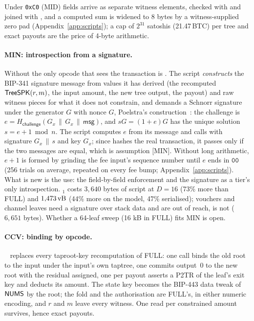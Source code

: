 Under \texttt{0xC0} (MID) fields arrive as separate witness elements,
checked with  and joined with , and a computed sum is
widened to 8 bytes by a witness-supplied zero pad
(Appendix~\ref{app:scripts}); a cap of $2^{31}$ satoshis (21.47\,BTC) per
tree and exact payouts are the price of 4-byte arithmetic.

\paragraph{MIN: introspection from a signature.}\label{sec:min}
Without  the only opcode that sees the transaction is
. The script \emph{constructs} the BIP-341 signature message
from values it has derived (the recomputed $\mathsf{TreeSPK}(r,m)$, the input
amount, the new tree output, the payout) and raw witness pieces for what
it does not constrain, and demands a Schnorr signature under the
generator $G$ with nonce $G$, Poelstra's construction~\cite{catschnorr}:
the challenge is $e = H_{\mathsf{challenge}}(G_x \,\|\, G_x \,\|\,
\mathsf{msg})$, and $s G = (1 + e) G$ has the unique solution
$s = e + 1 \bmod n$. The script computes $e$ from its message and calls
 with signature $G_x \,\|\, s$ and key $G_x$; since
 hashes the real transaction, it passes only if the two
messages are equal, which is assumption [MIN]. Without long
arithmetic, $e + 1$ is formed by grinding the fee input's sequence number
until $e$ ends in $\mathtt{00}$ (256 trials on average, repeated on every
fee bump; Appendix~\ref{app:scripts}). What is new is the use: the
field-by-field enforcement and the signature as a tier's only
introspection. $_1$ costs
$3{,}640$ bytes of script at $D = 16$ (73\% more than FULL) and
$1{,}473\,\mathrm{vB}$ (44\% more on the model, 47\% serialised); vouchers and channel leaves need a signature
over stack data and are out of reach,  is not ($6{,}651$
bytes). Whether a 64-leaf sweep (16 kB in FULL) fits MIN is open.

\paragraph{CCV: binding by opcode.}\label{sec:ccv}
~\cite{bip443} replaces every taproot-key
recomputation of FULL: one call binds the old root to the input under
the input's own taptree, one commits output~0 to the new root with the
residual assigned, one per payout asserts a P2TR of the leaf's exit key
and deducts its amount. The state key becomes the BIP-443 data tweak of
$\mathsf{NUMS}$ by the root; the fold and the authorisation are FULL's, in either
numeric encoding, and $r$ and $m$ leave every witness. One  read
per constrained amount survives, hence exact payouts.
\else
